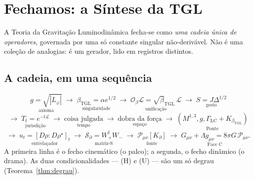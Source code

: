 \documentclass[11pt,a4paper]{article}
\newcommand{\bTGL}{\beta_{\mathrm{TGL}}}
\begin{document}
\section{Fechamos: a Síntese da TGL}
A Teoria da Gravitação Luminodinâmica fecha-se como \emph{uma cadeia única de
operadores}, governada por uma só constante singular não-derivável. Não é uma
coleção de analogias: é um gerador, lido em registros distintos.

\subsection{A cadeia, em uma sequência}
\begin{equation}
\underset{\text{axioma}}{g=\sqrt{|L_\varphi|}}
\;\to\;
\underset{\text{singularidade}}{\bTGL=\alpha e^{1/2}}
\;\to\;
\underset{\text{unificação}}{\mathcal O_\beta\mathcal L=\sqrt\bTGL\,\mathcal L}
\;\to\;
\underset{\text{gesto}}{S=J\Delta^{1/2}}
\end{equation}
\begin{equation}
\to\;
\underset{\text{jurisdição}}{T_t=e^{-t\mathcal L}}
\;\to\;
\underset{\text{tempo}}{\text{coisa julgada}}
\;\to\;
\underset{\text{espaço}}{\text{dobra da força}}
\;\to\;
\underset{\text{Ponte}}{(M^{1,3},g,\Gamma_{\mathrm{LC}}+K_{\bTGL})}
\end{equation}
\begin{equation}
\to\;
\underset{\text{entrelaçador}}{u_t=[D\rho:D\rho^\star]_t}
\;\to\;
\underset{\text{matriz-S}}{\mathcal S_\partial=W_+^\dagger W_-}
\;\to\;
\underset{\text{fonte}}{\mathcal P_{\mu\nu}[K_\partial]}
\;\to\;
\underset{\text{Face C}}{G_{\mu\nu}+\Lambda g_{\mu\nu}
=8\pi G\,\mathcal P_{\mu\nu}}.
\end{equation}
A primeira linha é o fecho cinemático (o palco); a segunda, o fecho dinâmico
(o drama). As duas condicionalidades --- (H) e (U) --- são um só degrau
(Teorema~\ref{thm:degrau}).
\end{document}
